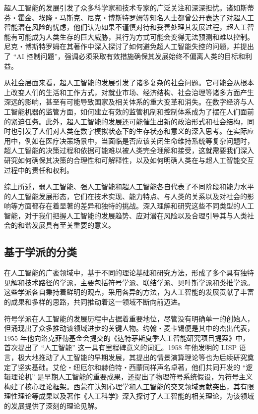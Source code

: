 超人工智能的发展引发了众多科学家和技术专家的广泛关注和深深担忧。诸如斯蒂芬・霍金、埃隆・马斯克、尼克・博斯特罗姆等知名人士都曾公开表达了对超人工智能潜在风险的忧虑，他们认为如果不谨慎对待和妥善处理其发展过程，超人工智能有可能成为人类生存的巨大威胁，其行为方式可能会变得无法预测和难以控制。尼克・博斯特罗姆在其著作中深入探讨了如何避免超人工智能失控的问题，并提出了 “AI 控制问题”，强调必须采取有效措施确保其发展始终不偏离人类的目标和利益。


从社会层面来看，超人工智能的发展引发了诸多复杂的社会问题。它可能会从根本上改变人们的生活和工作方式，对就业市场、经济结构、社会治理等诸多方面产生深远的影响，甚至有可能导致国家及相关体系的重大变革和消失。在数字经济与人工智能机器的监管方面，如何建立有效的监管机制和控制体系成为了摆在人们面前的紧迫任务。此外，超人工智能的发展还可能催生出新的政治形式和社会结构，同时也引发了人们对人类在数字模拟状态下的生存状态和意义的深入思考。在实际应用中，例如在医疗决策场景中，当面临是否应该关闭生命维持系统等复杂问题时，超人工智能的决策过程和依据可能难以被人类完全理解和接受，这就需要我们深入研究如何确保其决策的合理性和可解释性，以及如何明确人类在与超人工智能交互过程中的责任和权利。


综上所述，弱人工智能、强人工智能和超人工智能各自代表了不同阶段和能力水平的人工智能发展形态，它们在技术实现、能力特点、与人类的关系以及对社会的影响等方面都存在着显著的差异和独特的挑战。深入理解和研究这些不同类型的人工智能，对于我们把握人工智能的发展趋势、应对潜在风险以及合理引导其与人类社会的和谐发展具有至关重要的意义。


\subsection{基于学派的分类}
在人工智能的广袤领域中，基于不同的理论基础和研究方法，形成了多个具有独特见解和技术路径的学派，主要包括符号学派、联结学派、贝叶斯学派和类推学派。这些学派各自秉持着鲜明的观点，采用各异的方法，为人工智能的发展贡献了丰富的成果和多样的思路，共同推动着这一领域不断向前迈进。





符号学派在人工智能的发展历程中占据着重要地位，尽管没有明确单一的创始人，但涌现出了众多推动该领域进步的关键人物。约翰・麦卡锡便是其中的杰出代表，1955 年他向洛克菲勒基金会提交的《达特茅斯夏季人工智能研究项目提案》中，首次提出了 “人工智能” 这一具有里程碑意义的词汇。1958 年他发明的 LISP 语言，极大地推动了人工智能的早期发展，其提出的情景演算理论等也为后续研究奠定了坚实基础。艾伦・纽厄尔和赫伯特・西蒙同样声名卓著，他们共同开发的 “逻辑理论机” 是早期人工智能的重要成果，还提出了物理符号系统假设，为符号主义构建了核心理论框架。西蒙在认知心理学和人工智能的交叉领域贡献突出，其有限理性理论等成果以及著作《人工科学》深入探讨了人工智能的相关理论，为该领域的发展提供了深刻的理论见解。


